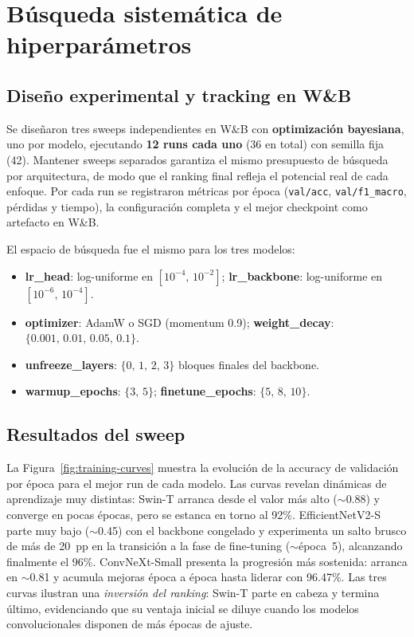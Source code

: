 \section{Búsqueda sistemática de hiperparámetros}

\subsection{Diseño experimental y tracking en W\&B}

Se diseñaron tres sweeps independientes en W\&B con \textbf{optimización bayesiana}, uno por modelo, ejecutando \textbf{12 runs cada uno} (36 en total) con semilla fija (42). Mantener sweeps separados garantiza el mismo presupuesto de búsqueda por arquitectura, de modo que el ranking final refleja el potencial real de cada enfoque. Por cada run se registraron métricas por época (\texttt{val/acc}, \texttt{val/f1\_macro}, pérdidas y tiempo), la configuración completa y el mejor checkpoint como artefacto en W\&B.

El espacio de búsqueda fue el mismo para los tres modelos:

\begin{itemize}\setlength\itemsep{2pt}
    \item \textbf{lr\_head}: log-uniforme en $[10^{-4},\,10^{-2}]$; \quad \textbf{lr\_backbone}: log-uniforme en $[10^{-6},\,10^{-4}]$.
    \item \textbf{optimizer}: AdamW o SGD (momentum 0.9); \quad \textbf{weight\_decay}: $\{0.001,\,0.01,\,0.05,\,0.1\}$.
    \item \textbf{unfreeze\_layers}: $\{0,\,1,\,2,\,3\}$ bloques finales del backbone.
    \item \textbf{warmup\_epochs}: $\{3,\,5\}$; \quad \textbf{finetune\_epochs}: $\{5,\,8,\,10\}$.
\end{itemize}

\subsection{Resultados del sweep}

La Figura~\ref{fig:training-curves} muestra la evolución de la accuracy de validación por época para el mejor run de cada modelo. Las curvas revelan dinámicas de aprendizaje muy distintas: Swin-T arranca desde el valor más alto ($\sim$0.88) y converge en pocas épocas, pero se estanca en torno al 92\%. EfficientNetV2-S parte muy bajo ($\sim$0.45) con el backbone congelado y experimenta un salto brusco de más de 20~pp en la transición a la fase de fine-tuning ($\sim$época~5), alcanzando finalmente el 96\%. ConvNeXt-Small presenta la progresión más sostenida: arranca en $\sim$0.81 y acumula mejoras época a época hasta liderar con 96.47\%. Las tres curvas ilustran una \textit{inversión del ranking}: Swin-T parte en cabeza y termina último, evidenciando que su ventaja inicial se diluye cuando los modelos convolucionales disponen de más épocas de ajuste.


